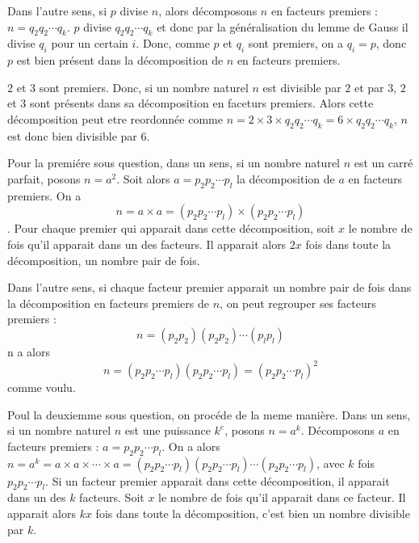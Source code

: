 Dans l'autre sens, si \(p\) divise \(n\), alors décomposons \(n\) en facteurs premiers : \(n = q_2 q_2 \cdots q_{k}\). \(p\) divise \(q_2 q_2 \cdots q_{k}\) et donc par la généralisation du lemme de Gauss il divise \(q_{i}\) pour un certain \(i\). Donc, comme \(p\) et \(q_{i}\) sont premiers, on a \(q_{i} = p\), donc \(p\) est bien présent dans la décomposition de \(n\) en facteurs premiers.

\sol

\(2\) et \(3\) sont premiers. Donc, si un nombre naturel \(n\) est divisible par \(2\) et par \(3\), \(2\) et \(3\) sont présents dans sa décomposition en faceturs premiers. Alors cette décomposition peut etre reordonnée comme \(n = 2 \times 3 \times q_2 q_2 \cdots q_{k} = 6 \times q_2 q_2 \cdots q_{k}\), \(n\) est donc bien divisible par \(6\).

\sol

Pour la premiére sous question, dans un sens, si un nombre naturel \(n\) est un carré parfait, posons \(n = a^2\). Soit alors \(a = p_2 p_2 \cdots p_{l}\) la décomposition de \(a\) en facteurs premiers. On a
\[n = a \times a = \left(p_2 p_2 \cdots p_{l}\right) \times \left(p_2 p_2 \cdots p_{l}\right)\]. Pour chaque premier qui apparait dans cette décomposition, soit \(x\) le nombre de fois qu'il apparait dans un des facteurs. Il apparait alors \(2x\) fois dans toute la décomposition, un nombre pair de fois.

Dans l'autre sens, si chaque facteur premier apparait un nombre pair de fois dans la décomposition en facteurs premiers de \(n\), on peut regrouper ses facteurs premiers :
\[n = \left(p_2 p_2\right)\left(p_2 p_2\right) \cdots \left(p_{l} p_{l}\right)\]
n a alors
\[n = \left(p_2 p_2 \cdots p_{l}\right) \left(p_2 p_2 \cdots p_{l}\right) = \left(p_2 p_2 \cdots p_{l}\right)^2\]
comme voulu.

Poul la deuxiemme sous question, on procéde de la meme manière.
Dans un sens, si un nombre naturel \(n\) est
une puissance \(k^{e}\), posons \(n=a^{k}\).
Décomposons \(a\) en facteurs premiers : \(a = p_2 p_2 \cdots p_{l}\). On a alors \(n = a^{k} = a \times a \times \cdots \times a = \left(p_2 p_2 \cdots p_{l}\right) \left(p_2 p_2 \cdots p_{l}\right) \cdots \left(p_2 p_2 \cdots p_{l}\right)\), avec \(k\) fois \(p_2 p_2 \cdots p_{l}\). Si un facteur premier apparait dans cette décomposition, il apparait dans un des \(k\) facteurs. Soit \(x\) le nombre de fois qu'il apparait dans ce facteur. Il apparait alors \(kx\) fois dans toute la décomposition, c'est bien un nombre divisible par \(k\).

